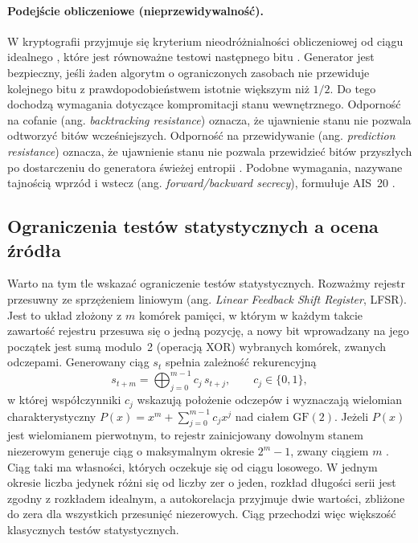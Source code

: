 \paragraph{Podejście obliczeniowe (nieprzewidywalność).}
W kryptografii przyjmuje się kryterium nieodróżnialności obliczeniowej od
ciągu idealnego \cite{yao1982theory}, które jest równoważne testowi
następnego bitu \cite{blum1984how,goldreich2001foundations}. Generator jest
bezpieczny, jeśli żaden algorytm o ograniczonych zasobach nie przewiduje
kolejnego bitu z prawdopodobieństwem istotnie większym niż $1/2$. Do tego
dochodzą wymagania dotyczące kompromitacji stanu wewnętrznego. Odporność na
cofanie (ang. \emph{backtracking resistance}) oznacza, że ujawnienie stanu
nie pozwala odtworzyć bitów wcześniejszych. Odporność na przewidywanie
(ang. \emph{prediction resistance}) oznacza, że ujawnienie stanu nie pozwala
przewidzieć bitów przyszłych po dostarczeniu do generatora świeżej entropii
\cite{barker2015sp80090a}. Podobne wymagania, nazywane tajnością wprzód
i wstecz (ang. \emph{forward/backward secrecy}), formułuje AIS~20
\cite{killmann2011ais31}.

\subsection{Ograniczenia testów statystycznych a ocena źródła}

Warto na tym tle wskazać ograniczenie testów statystycznych. Rozważmy rejestr
przesuwny ze sprzężeniem liniowym (ang. \emph{Linear Feedback Shift
Register}, LFSR). Jest to układ złożony z $m$ komórek pamięci, w którym
w każdym takcie zawartość rejestru przesuwa się o jedną pozycję, a nowy bit
wprowadzany na jego początek jest sumą modulo~2 (operacją XOR) wybranych
komórek, zwanych odczepami. Generowany ciąg $s_t$ spełnia zależność
rekurencyjną
%
\begin{equation}
  s_{t+m} = \bigoplus_{j=0}^{m-1} c_j\, s_{t+j},
  \qquad c_j \in \{0,1\},
  \label{eq:lfsr}
\end{equation}
%
w której współczynniki $c_j$ wskazują położenie odczepów i wyznaczają
wielomian charakterystyczny $P(x) = x^m + \sum_{j=0}^{m-1} c_j x^j$ nad ciałem
$\mathrm{GF}(2)$. Jeżeli $P(x)$ jest wielomianem pierwotnym, to rejestr
zainicjowany dowolnym stanem niezerowym generuje ciąg o maksymalnym okresie
$2^m - 1$, zwany ciągiem $m$ \cite{golomb1982shift}. Ciąg taki ma własności,
których oczekuje się od ciągu losowego. W jednym okresie liczba jedynek
różni się od liczby zer o jeden, rozkład długości serii jest zgodny
z rozkładem idealnym, a autokorelacja przyjmuje dwie wartości, zbliżone do
zera dla wszystkich przesunięć niezerowych. Ciąg przechodzi więc większość
klasycznych testów statystycznych.

